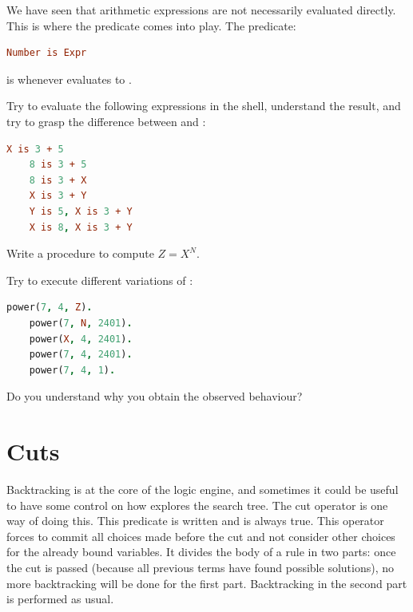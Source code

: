 \documentclass{../../../tp}
\begin{document}
We have seen that arithmetic expressions are not necessarily evaluated directly. This is where the  predicate comes into play. 
The predicate:

\begin{lstlisting}[language=prolog]
	Number is Expr
\end{lstlisting} 

is  whenever  evaluates to . 


\begin{instruction}
	Try to evaluate the following expressions in the \prolog shell, understand the result, and try to grasp the difference between \prologcode{=} and : 
	
	\begin{lstlisting}[language=prolog]
	X is 3 + 5
	8 is 3 + 5
	8 is 3 + X
	X is 3 + Y
	Y is 5, X is 3 + Y
	X is 8, X is 3 + Y
	\end{lstlisting}
\end{instruction}

\begin{instruction}	
	Write a  procedure to compute $Z = X^N$. 
	
	Try to execute different variations of :
	
	\begin{lstlisting}[language=prolog]
	power(7, 4, Z).
	power(7, N, 2401).
	power(X, 4, 2401).
	power(7, 4, 2401).
	power(7, 4, 1).
	\end{lstlisting}
	
	Do you understand why you obtain the observed behaviour?
\end{instruction}

\section{Cuts}

Backtracking is at the core of the logic engine, and sometimes it could be useful to have some control on how \prolog explores the search tree. The cut operator is one way of doing this. This predicate is written \prologcode{!} and is always true. This operator forces \prolog to commit all choices made before the cut and not consider other choices for the already bound variables. It divides the body of a rule in two parts: once the cut is passed (because all previous terms have found possible solutions), no more backtracking will be done for the first part. Backtracking in the second part is performed as usual.
\end{document}
